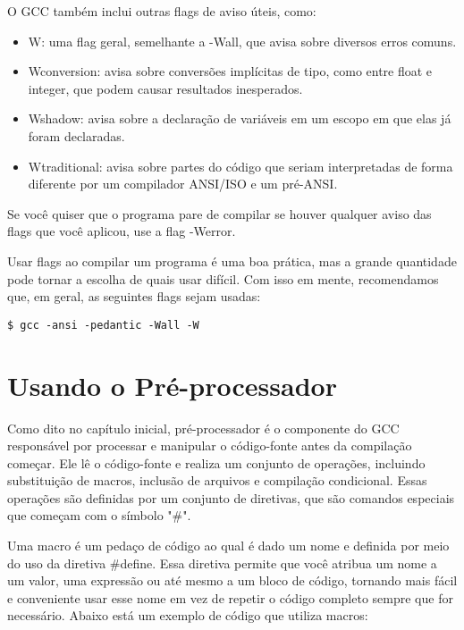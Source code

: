    O GCC também inclui outras flags de aviso úteis, como:

\begin{itemize}
    \item W: uma flag geral, semelhante a -Wall, que avisa sobre diversos erros comuns.
    
    \item Wconversion: avisa sobre conversões implícitas de tipo, como entre float e integer, que podem causar resultados inesperados.
    
    \item Wshadow: avisa sobre a declaração de variáveis em um escopo em que elas já foram declaradas.
    
    \item Wtraditional: avisa sobre partes do código que seriam interpretadas de forma diferente por um compilador ANSI/ISO e um pré-ANSI.
\end{itemize}

Se você quiser que o programa pare de compilar se houver qualquer aviso das flags que você aplicou, use a flag -Werror.

Usar flags ao compilar um programa é uma boa prática, mas a grande quantidade pode tornar a escolha de quais usar difícil. Com isso em mente, recomendamos que, em geral, as seguintes flags sejam usadas:

\begin{scriptsize}
\estilobash
\begin{lstlisting}
$ gcc -ansi -pedantic -Wall -W
\end{lstlisting}
\end{scriptsize}


\section{Usando o Pré-processador}


Como dito no capítulo inicial, pré-processador é o componente do GCC responsável por processar e manipular o código-fonte antes da compilação começar. Ele lê o código-fonte e realiza um conjunto de operações, incluindo substituição de macros, inclusão de arquivos e compilação condicional. Essas operações são definidas por um conjunto de diretivas, que são comandos especiais que começam com o símbolo "\#".

Uma macro é um pedaço de código ao qual é dado um nome e definida por meio do uso da diretiva \#define. Essa diretiva permite que você atribua um nome a um valor, uma expressão ou até mesmo a um bloco de código, tornando mais fácil e conveniente usar esse nome em vez de repetir o código completo sempre que for necessário. Abaixo está um exemplo de código que utiliza macros:

